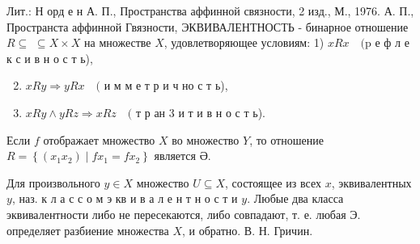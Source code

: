 \documentclass[10pt]{article}
\begin{document}
Лит.: Н орд е н А. П., Пространства аффинной связности, 2 изд., М., 1976. А. П., Пространста аффинной Гвязности, ЭКВИВАЛЕНТНОСТЬ - бинарное отношение $R \subseteq$ $\subseteq X \times X$ на множестве $X$, удовлетворяющее условиям: 1) $x R x \quad(\mathrm{p}$ е ф л е к с и в н о с т ь),



\begin{enumerate}

  \setcounter{enumi}{1}

  \item $x R y \Rightarrow y R x \quad($ и м м е т р и ч но с т ь),



  \item $x R y \wedge y R z \Rightarrow x R z \quad($ т р ан 3 и т и в н о с т ь).



\end{enumerate}



Если $f$ отображает множество $X$ во множество $Y$, то отношение $R=\left\{\left(x_{1} x_{2}\right) \mid f x_{1}=f x_{2}\right\}$ является $Ә$.



Для произвольного $y \in X$ множество $U \subseteq X$, состоящее из всех $x$, эквивалентных $y$, наз. к л а с с о м э кв и в а л е н т н о с т и $y$. Любые два класса эквивалентности либо не пересекаются, либо совпадают, т. е. любая Э. определяет разбиение множества $X$, и обратно. В. Н. Гричин.
\end{document}

